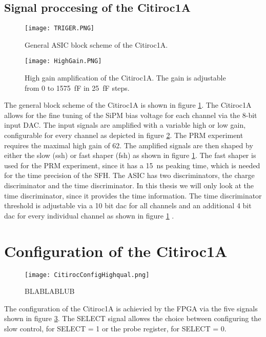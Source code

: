 \subsection{Signal proccesing of the Citiroc1A}
\begin{figure}[h]
    \centering
    \texttt{[image: TRIGER.PNG]}
    \caption{General ASIC block scheme of the Citiroc1A. \autocite{datasheetCITIROC}}
    \label{fig:CITIROC1A_TRIGEER}
\end{figure}

\begin{figure}[h]
    \centering
    \texttt{[image: HighGain.PNG]}
    \caption{High gain amplification of the Citiroc1A. The gain is adjustable from 0 to \SI{1575}{\femto\farad} in \SI{25}{\femto\farad} steps.\autocite{datasheetCITIROC}}
    \label{HighGain}
\end{figure}
The general block scheme of the Citiroc1A is shown in figure \ref{fig:CITIROC1A_TRIGEER}.
\newline
The Citiroc1A allows for the fine tuning of the SiPM bias voltage for each channel via the 8-bit input DAC.
\newline	
The input signals are amplified with a variable high or low gain, configurable for every channel as depicted in figure \ref{HighGain}. 
The PRM experiment requires the maximal high gain of 62.\autocite{InternalcommunicationIgor}
\newline
The amplified signals are then shaped by either the slow (ssh) or fast shaper (fsh) as shown in figure \ref{fig:CITIROC1A_TRIGEER}. 
The fast shaper is used for the PRM experiment, since it has a \SI{15}{\nano\second} peaking time, which is needed for the time precision of the SFH.
\newline
The ASIC has two discriminators, the charge discriminator and the time discriminator. In this thesis we will only look at the time discriminator,
 since it provides the time information.
The time discriminator threshold is adjustable via a 10 bit dac for all channels and an additional 4 bit dac for every individual channel as shown in figure \ref{fig:CITIROC1A_TRIGEER} \autocite{datasheetCITIROC}.


\section{Configuration of the Citiroc1A}
\begin{figure}[h]
    \centering
    \texttt{[image: CitirocConfigHighqual.png]}
    \caption{BLABLABLUB\autocite{datasheetCITIROC}}
    \label{fig:CITIROC1A_config}
\end{figure}
The configuration of the Citiroc1A is achievied by the FPGA via the five signals shown in figure \ref{fig:CITIROC1A_config}.
The SELECT signal allowes the choice between configuring the slow control, for SELECT = 1  or the probe register, for SELECT = 0.\autocite{datasheetCITIROC}

